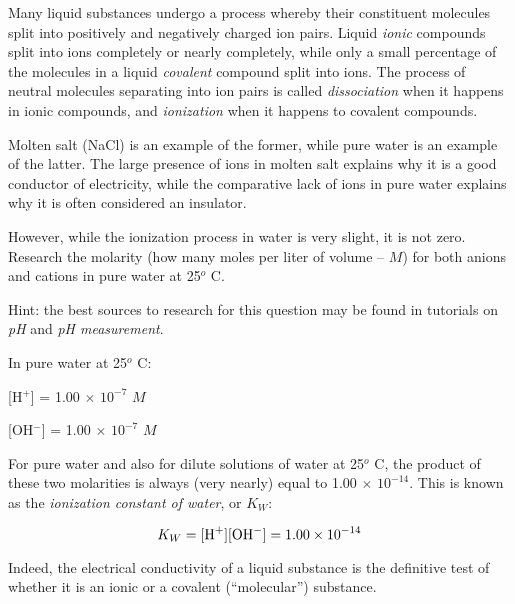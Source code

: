 

Many liquid substances undergo a process whereby their constituent molecules split into positively and negatively charged ion pairs.  Liquid {\it ionic} compounds split into ions completely or nearly completely, while only a small percentage of the molecules in a liquid {\it covalent} compound split into ions.  The process of neutral molecules separating into ion pairs is called {\it dissociation} when it happens in ionic compounds, and {\it ionization} when it happens to covalent compounds.


Molten salt (NaCl) is an example of the former, while pure water is an example of the latter.  The large presence of ions in molten salt explains why it is a good conductor of electricity, while the comparative lack of ions in pure water explains why it is often considered an insulator.

However, while the ionization process in water is very slight, it is not zero.  Research the molarity (how many moles per liter of volume -- $M$) for both anions and cations in pure water at 25$^{o}$ C.

\vskip 10pt

Hint: the best sources to research for this question may be found in tutorials on {\it pH} and {\it pH measurement}.







\noindent
In pure water at 25$^{o}$ C:

\vskip 10pt

[H$^{+}$] = 1.00 $\times$ $10^{-7}$ $M$ 

\vskip 10pt

[OH$^{-}$] = 1.00 $\times$ $10^{-7}$ $M$ 

\vskip 10pt

For pure water and also for dilute solutions of water at 25$^{o}$ C, the product of these two molarities is always (very nearly) equal to 1.00 $\times$ $10^{-14}$.  This is known as the {\it ionization constant of water}, or $K_W$:

$$K_W = [\hbox{H}^{+}] [\hbox{OH}^{-}] = 1.00 \times 10^{-14}$$







Indeed, the electrical conductivity of a liquid substance is the definitive test of whether it is an ionic or a covalent (``molecular'') substance.




